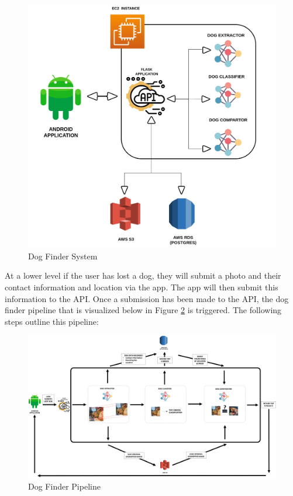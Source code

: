 \documentclass{article}
\begin{document}
\begin{figure}[h]
\centering
	\includegraphics[scale=0.1]{final-report-images/system.jpeg}
\caption{Dog Finder System}
\label{fig:x app system}
\end{figure}

At a lower level if the user has lost a dog, they will submit a photo and their contact information and location via the app.  The app will then submit this information to the API.  Once a submission has been made to the API, the dog finder pipeline that is visualized below in Figure \ref{fig:x app pipeline} is triggered.  The following steps outline this pipeline:
\newpage

\begin{figure}[h]
\centering
	\includegraphics[width=1.0\textwidth]{final-report-images/applowlevel.png}
\caption{Dog Finder Pipeline}
\label{fig:x app pipeline}
\end{figure}
\end{document}
